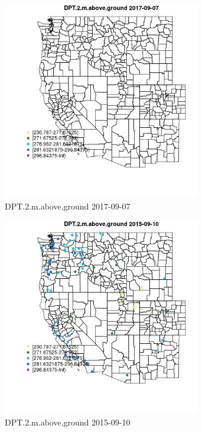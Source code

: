 \begin{figure} 
\centering  
\includegraphics[width=0.77\textwidth]{Code_Outputs/Report_ML_input_PM25_Step4_part_e_de_duplicated_aveswNAs_MapObsDPT2maboveground2017-09-07.jpg} 
\caption{\label{fig:Report_ML_input_PM25_Step4_part_e_de_duplicated_aveswNAsMapObsDPT2maboveground2017-09-07}DPT.2.m.above.ground 2017-09-07} 
\end{figure} 
 

\begin{figure} 
\centering  
\includegraphics[width=0.77\textwidth]{Code_Outputs/Report_ML_input_PM25_Step4_part_e_de_duplicated_aveswNAs_MapObsDPT2maboveground2015-09-10.jpg} 
\caption{\label{fig:Report_ML_input_PM25_Step4_part_e_de_duplicated_aveswNAsMapObsDPT2maboveground2015-09-10}DPT.2.m.above.ground 2015-09-10} 
\end{figure} 
 

